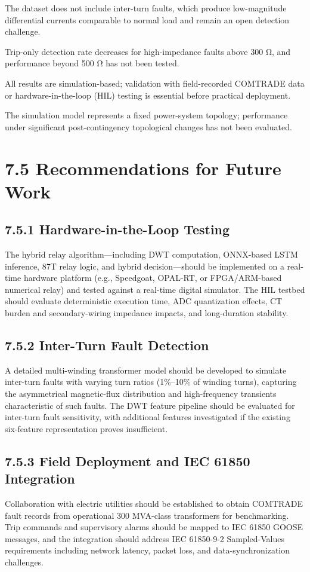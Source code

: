 The dataset does not include inter-turn faults, which produce low-magnitude differential currents comparable to normal load and remain an open detection challenge.

Trip-only detection rate decreases for high-impedance faults above 300 Ω, and performance beyond 500 Ω has not been tested.

All results are simulation-based; validation with field-recorded COMTRADE data or hardware-in-the-loop (HIL) testing is essential before practical deployment.

The simulation model represents a fixed power-system topology; performance under significant post-contingency topological changes has not been evaluated.


\section{7.5  Recommendations for Future Work}

\subsection{7.5.1  Hardware-in-the-Loop Testing}
The hybrid relay algorithm---including DWT computation, ONNX-based LSTM inference, 87T relay logic, and hybrid decision---should be implemented on a real-time hardware platform (e.g., Speedgoat, OPAL-RT, or FPGA/ARM-based numerical relay) and tested against a real-time digital simulator. The HIL testbed should evaluate deterministic execution time, ADC quantization effects, CT burden and secondary-wiring impedance impacts, and long-duration stability.


\subsection{7.5.2  Inter-Turn Fault Detection}
A detailed multi-winding transformer model should be developed to simulate inter-turn faults with varying turn ratios (1\%--10\% of winding turns), capturing the asymmetrical magnetic-flux distribution and high-frequency transients characteristic of such faults. The DWT feature pipeline should be evaluated for inter-turn fault sensitivity, with additional features investigated if the existing six-feature representation proves insufficient.


\subsection{7.5.3  Field Deployment and IEC 61850 Integration}
Collaboration with electric utilities should be established to obtain COMTRADE fault records from operational 300 MVA-class transformers for benchmarking. Trip commands and supervisory alarms should be mapped to IEC 61850 GOOSE messages, and the integration should address IEC 61850-9-2 Sampled-Values requirements including network latency, packet loss, and data-synchronization challenges.


